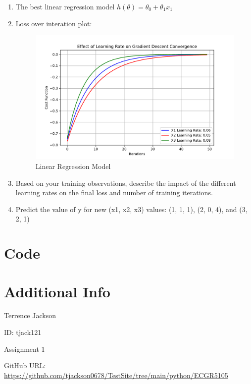 \documentclass{article}
\begin{document}
\begin{enumerate}
    \item The best linear regression model $ h(\theta) = \theta_0 + \theta_1x_1 $ 

    \item Loss over interation plot: 

    \begin{figure}[h]
        \centering
        \includegraphics[width=0.9 \linewidth]{ECGR5105/regressionModel.pdf}
        \caption{\label{fig:graph} Linear Regression Model }
    \end{figure}

    \item Based on your training observations, describe the impact of the different learning rates on the final loss and number of training iterations.
    \item Predict the value of y for new (x1, x2, x3) values: (1, 1, 1), (2, 0, 4), and (3, 2, 1)


\end{enumerate}


\section{Code}



\section{Additional Info}

Terrence Jackson

ID: tjack121

Assignment 1 

GitHub URL: 
\url{https://github.com/tjackson0678/TestSite/tree/main/python/ECGR5105}
\end{document}
